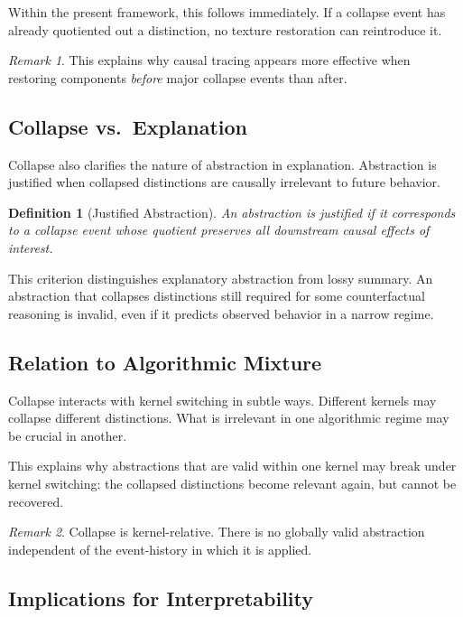 \documentclass[11pt]{article}
\newtheorem{definition}{Definition}
\theoremstyle{remark}
\newtheorem{remark}{Remark}
\begin{document}
Within the present framework, this follows immediately. If a collapse
event has already quotiented out a distinction, no texture restoration
can reintroduce it.

\begin{remark}
This explains why causal tracing appears more effective when restoring
components \emph{before} major collapse events than after.
\end{remark}

\subsection{Collapse vs.\ Explanation}

Collapse also clarifies the nature of abstraction in explanation.
Abstraction is justified when collapsed distinctions are causally
irrelevant to future behavior.

\begin{definition}[Justified Abstraction]
An abstraction is justified if it corresponds to a collapse event whose
quotient preserves all downstream causal effects of interest.
\end{definition}

This criterion distinguishes explanatory abstraction from lossy
summary. An abstraction that collapses distinctions still required for
some counterfactual reasoning is invalid, even if it predicts observed
behavior in a narrow regime.

\subsection{Relation to Algorithmic Mixture}

Collapse interacts with kernel switching in subtle ways. Different
kernels may collapse different distinctions. What is irrelevant in one
algorithmic regime may be crucial in another.

This explains why abstractions that are valid within one kernel may
break under kernel switching: the collapsed distinctions become
relevant again, but cannot be recovered.

\begin{remark}
Collapse is kernel-relative. There is no globally valid abstraction
independent of the event-history in which it is applied.
\end{remark}

\subsection{Implications for Interpretability}
\end{document}
